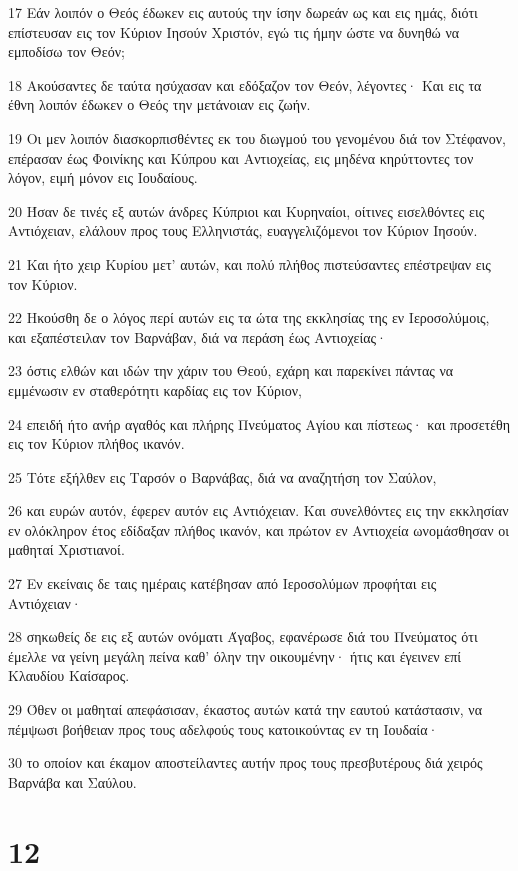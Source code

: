 \par 17 Εάν λοιπόν ο Θεός έδωκεν εις αυτούς την ίσην δωρεάν ως και εις ημάς, διότι επίστευσαν εις τον Κύριον Ιησούν Χριστόν, εγώ τις ήμην ώστε να δυνηθώ να εμποδίσω τον Θεόν;
\par 18 Ακούσαντες δε ταύτα ησύχασαν και εδόξαζον τον Θεόν, λέγοντες· Και εις τα έθνη λοιπόν έδωκεν ο Θεός την μετάνοιαν εις ζωήν.
\par 19 Οι μεν λοιπόν διασκορπισθέντες εκ του διωγμού του γενομένου διά τον Στέφανον, επέρασαν έως Φοινίκης και Κύπρου και Αντιοχείας, εις μηδένα κηρύττοντες τον λόγον, ειμή μόνον εις Ιουδαίους.
\par 20 Ήσαν δε τινές εξ αυτών άνδρες Κύπριοι και Κυρηναίοι, οίτινες εισελθόντες εις Αντιόχειαν, ελάλουν προς τους Ελληνιστάς, ευαγγελιζόμενοι τον Κύριον Ιησούν.
\par 21 Και ήτο χειρ Κυρίου μετ' αυτών, και πολύ πλήθος πιστεύσαντες επέστρεψαν εις τον Κύριον.
\par 22 Ηκούσθη δε ο λόγος περί αυτών εις τα ώτα της εκκλησίας της εν Ιεροσολύμοις, και εξαπέστειλαν τον Βαρνάβαν, διά να περάση έως Αντιοχείας·
\par 23 όστις ελθών και ιδών την χάριν του Θεού, εχάρη και παρεκίνει πάντας να εμμένωσιν εν σταθερότητι καρδίας εις τον Κύριον,
\par 24 επειδή ήτο ανήρ αγαθός και πλήρης Πνεύματος Αγίου και πίστεως· και προσετέθη εις τον Κύριον πλήθος ικανόν.
\par 25 Τότε εξήλθεν εις Ταρσόν ο Βαρνάβας, διά να αναζητήση τον Σαύλον,
\par 26 και ευρών αυτόν, έφερεν αυτόν εις Αντιόχειαν. Και συνελθόντες εις την εκκλησίαν εν ολόκληρον έτος εδίδαξαν πλήθος ικανόν, και πρώτον εν Αντιοχεία ωνομάσθησαν οι μαθηταί Χριστιανοί.
\par 27 Εν εκείναις δε ταις ημέραις κατέβησαν από Ιεροσολύμων προφήται εις Αντιόχειαν·
\par 28 σηκωθείς δε εις εξ αυτών ονόματι Άγαβος, εφανέρωσε διά του Πνεύματος ότι έμελλε να γείνη μεγάλη πείνα καθ' όλην την οικουμένην· ήτις και έγεινεν επί Κλαυδίου Καίσαρος.
\par 29 Όθεν οι μαθηταί απεφάσισαν, έκαστος αυτών κατά την εαυτού κατάστασιν, να πέμψωσι βοήθειαν προς τους αδελφούς τους κατοικούντας εν τη Ιουδαία·
\par 30 το οποίον και έκαμον αποστείλαντες αυτήν προς τους πρεσβυτέρους διά χειρός Βαρνάβα και Σαύλου.

\chapter{12}

